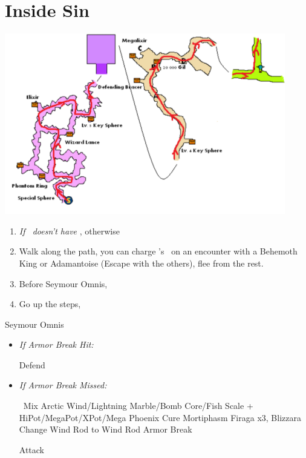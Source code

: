 \chapter{Inside Sin}
\includegraphics{graphics/sinpath}
\begin{enumerate}
	\item \textit{If \rikku\ doesn't have \od} \formation{\tidus}{\auron}{\rikku}, otherwise \formation{\tidus}{\auron}{\kimahri}
	\item Walk along the path, you can charge \rikku's \od\ on an encounter with a Behemoth King or Adamantoise (Escape with the others), flee from the rest.
	\item Before Seymour Omnis, \formation{\tidus}{\auron}{\yuna}
	\item Go up the steps, \sd
\end{enumerate}
\bothvfill\winvfill\lossvfill
\begin{battle}[80000]{Seymour Omnis}
	\begin{itemize}
		\yunaf Defend
		\tidusf Armor Break
		\item \textit{If Armor Break Hit:}
			\begin{itemize}
				\auronf Defend
			\end{itemize}
		\item \textit{If Armor Break Missed:}
			\begin{itemize}
				\switch{\auron}{\rikku}
				\rikkuf \od\ Mix Arctic Wind/Lightning Marble/Bomb Core/Fish Scale + HiPot/MegaPot/XPot/Mega Phoenix
				\yunaf Cure Mortiphasm
				\enemyf Firaga x3, Blizzara
				\yunaf Change Wind Rod to Wind Rod
				\tidusf Armor Break
			\end{itemize}
		\summon{\bahamut}
		\bahamutf Attack
	\end{itemize}
\end{battle}
